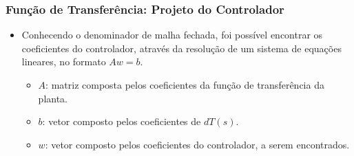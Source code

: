 \documentclass{beamer}
\begin{document}
\begin{frame}
\frametitle{Função de Transferência: Projeto do Controlador}
\begin{itemize}
\item Conhecendo o denominador de malha fechada, foi possível encontrar os coeficientes do controlador, através da resolução de um sistema de equações lineares, no formato $Aw=b$.
\begin{itemize}
\item $A$: matriz composta pelos coeficientes da função de transferência da planta.
\item $b$: vetor composto pelos coeficientes de $dT(s)$.
\item $w$: vetor composto pelos coeficientes do controlador, a serem encontrados.
\end{itemize}
\end{itemize}
\end{frame}


\end{document}
